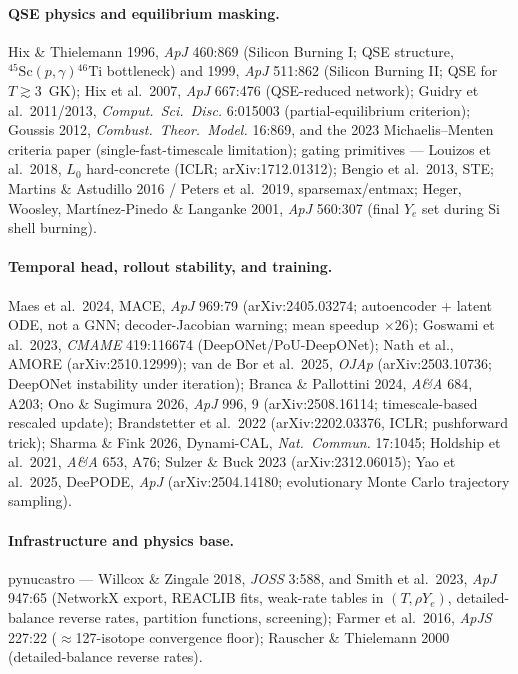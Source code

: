\documentclass[11pt]{article}
\newcommand{\Ye}{Y_{e}}
\begin{document}
\paragraph{QSE physics and equilibrium masking.} Hix \& Thielemann 1996, \emph{ApJ} 460:869 (Silicon Burning I; QSE structure, ${}^{45}\mathrm{Sc}(p,\gamma){}^{46}\mathrm{Ti}$ bottleneck) and 1999, \emph{ApJ} 511:862 (Silicon Burning II; QSE for $T \gtrsim 3$~GK); Hix et al.\ 2007, \emph{ApJ} 667:476 (QSE-reduced network); Guidry et al.\ 2011/2013, \emph{Comput.\ Sci.\ Disc.} 6:015003 (partial-equilibrium criterion); Goussis 2012, \emph{Combust.\ Theor.\ Model.} 16:869, and the 2023 Michaelis--Menten criteria paper (single-fast-timescale limitation); gating primitives --- Louizos et al.\ 2018, $L_0$ hard-concrete (ICLR; arXiv:1712.01312); Bengio et al.\ 2013, STE; Martins \& Astudillo 2016 / Peters et al.\ 2019, sparsemax/entmax; Heger, Woosley, Mart\'inez-Pinedo \& Langanke 2001, \emph{ApJ} 560:307 (final $\Ye$ set during Si shell burning).

\paragraph{Temporal head, rollout stability, and training.} Maes et al.\ 2024, MACE, \emph{ApJ} 969:79 (arXiv:2405.03274; autoencoder + latent ODE, not a GNN; decoder-Jacobian warning; mean speedup $\times 26$); Goswami et al.\ 2023, \emph{CMAME} 419:116674 (DeepONet/PoU-DeepONet); Nath et al., AMORE (arXiv:2510.12999); van de Bor et al.\ 2025, \emph{OJAp} (arXiv:2503.10736; DeepONet instability under iteration); Branca \& Pallottini 2024, \emph{A\&A} 684, A203; Ono \& Sugimura 2026, \emph{ApJ} 996, 9 (arXiv:2508.16114; timescale-based rescaled update); Brandstetter et al.\ 2022 (arXiv:2202.03376, ICLR; pushforward trick); Sharma \& Fink 2026, Dynami-CAL, \emph{Nat.\ Commun.} 17:1045; Holdship et al.\ 2021, \emph{A\&A} 653, A76; Sulzer \& Buck 2023 (arXiv:2312.06015); Yao et al.\ 2025, DeePODE, \emph{ApJ} (arXiv:2504.14180; evolutionary Monte Carlo trajectory sampling).

\paragraph{Infrastructure and physics base.} pynucastro --- Willcox \& Zingale 2018, \emph{JOSS} 3:588, and Smith et al.\ 2023, \emph{ApJ} 947:65 (NetworkX export, REACLIB fits, weak-rate tables in $(T, \rho\Ye)$, detailed-balance reverse rates, partition functions, screening); Farmer et al.\ 2016, \emph{ApJS} 227:22 ($\approx$127-isotope convergence floor); Rauscher \& Thielemann 2000 (detailed-balance reverse rates).
\end{document}
